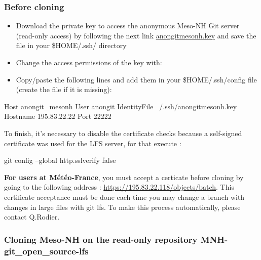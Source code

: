 \subsubsection{Before cloning}

\begin{itemize}
\item Download the private key to access the anonymous Meso-NH Git server (read-only access) by following the next link \href{http://mesonh.aero.obs-mip.fr/mesonh57/GitSources?action=AttachFile&do=get&target=anongitmesonh.key}{anongitmesonh.key} and save the file in your \$HOME/.ssh/ directory
\item Change the access permissions of the key with:
\end{itemize}
\begin{itemize}
\item Copy/paste the following lines and add them in your \$HOME/.ssh/config file (create the file if it is missing):
\end{itemize}
\begin{bashcode}
Host anongit_mesonh
  User anongit
  IdentityFile ~/.ssh/anongitmesonh.key
  Hostname 195.83.22.22
  Port 22222
\end{bashcode}

To finish, it's necessary to disable the certificate checks because a self-signed certificate was used for the LFS server, for that execute :
\begin{bashcode}
git config --global http.sslverify false
\end{bashcode}

\textbf{For users at Météo-France}, you must accept a certicate before cloning by going to the following address : \href{https://195.83.22.118/objects/batch}{https://195.83.22.118/objects/batch}.
This certificate acceptance must be done each time you may change a branch with changes in large files with git lfs. To make this process automatically, please contact Q.Rodier.

\subsubsection{Cloning Meso-NH on the read-only repository MNH-git\_open\_source-lfs}

